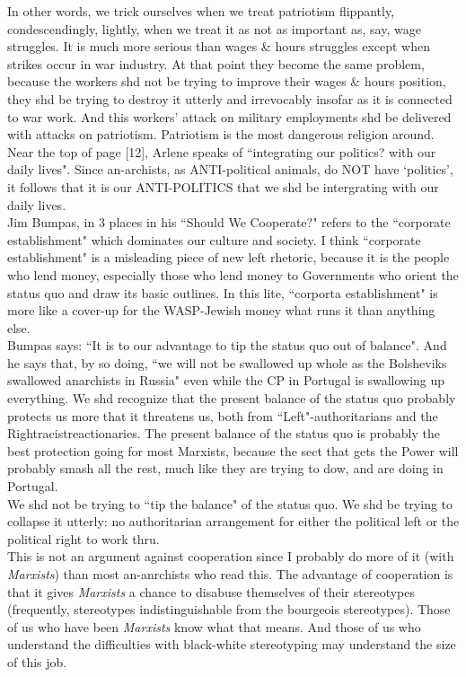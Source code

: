 \documentclass[12pt, onecolumn, letterpaper, oneside]{book}
\begin{document}
In other words, we trick ourselves when we treat patriotism flippantly, condescendingly, lightly, when we treat it as not as important as, say, wage struggles. It is much more serious than wages \& hours struggles except when strikes occur in war industry. At that point they become the same problem, because the workers shd not be trying to improve their wages \& hours position, they shd be trying to destroy it utterly and irrevocably insofar as it is connected to war work. And this workers' attack on military employments shd be delivered with attacks on patriotism. Patriotism is the most dangerous religion around.\\
Near the top of page [12], Arlene speaks of ``integrating our politics? with our daily lives". Since an-archists, as ANTI-political animals, do NOT have `politics', it follows that it is our ANTI-POLITICS that we shd be intergrating with our daily lives.\\
Jim Bumpas, in 3 places in his ``Should We Cooperate?" refers to the ``corporate establishment" which dominates our culture and society. I think ``corporate establishment" is a misleading piece of new left rhetoric, because it is the people who lend money, especially those who lend money to Governments who orient the status quo and draw its basic outlines. In this lite, ``corporta establishment" is more like a cover-up for the WASP-Jewish money what runs it than anything else.\\
Bumpas says: ``It is to our advantage to tip the status quo out of balance". And he says that, by so doing, ``we will not be swallowed up whole as the Bolsheviks swallowed anarchists in Russia" even while the CP in Portugal is swallowing up everything. We shd recognize that the present balance of the status quo probably protects us more that it threatens us, both from ``Left"-authoritarians and the Rightracistreactionaries. The present balance of the status quo is probably the best protection going for most Marxists, because the sect that gets the Power will probably smash all the rest, much like they are trying to dow, and are doing in Portugal.\\
We shd not be trying to ``tip the balance" of the status quo. We shd be trying to collapse it utterly: no authoritarian arrangement for either the political left or the political right to work thru.\\
This is not an argument against cooperation since I probably do more of it (with \emph{Marxists}) than most an-anrchists who read this. The advantage of cooperation is that it gives \emph{Marxists} a chance to disabuse themselves of their stereotypes (frequently, stereotypes indistinguishable from the bourgeois stereotypes). Those of us who have been \emph{Marxists} know what that means. And those of us who understand the difficulties with black-white stereotyping may understand the size of this job.
\end{document}
